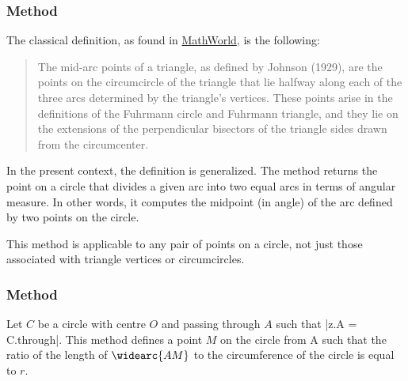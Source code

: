 \subsubsection{Method }
\label{ssub:method_circle_midarc}

The classical definition, as found in \href{https://mathworld.wolfram.com/Mid-ArcPoints.html}{MathWorld}, is the following:

\medskip
\begin{quote}
The mid-arc points of a triangle, as defined by Johnson (1929), are the points on the circumcircle of the triangle that lie halfway along each of the three arcs determined by the triangle's vertices. These points arise in the definitions of the Fuhrmann circle and Fuhrmann triangle, and they lie on the extensions of the perpendicular bisectors of the triangle sides drawn from the circumcenter.
\end{quote}

\medskip
\noindent
In the present context, the definition is generalized. The method returns the point on a circle that divides a given arc into two equal arcs in terms of angular measure. In other words, it computes the midpoint (in angle) of the arc defined by two points on the circle.

\medskip
\noindent
This method is applicable to any pair of points on a circle, not just those associated with triangle vertices or circumcircles.

\vspace{1em}
\begin{tkzexample}[latex=.5\textwidth]
\begin{center}
  \end{center}
\end{tkzexample}

\subsubsection{Method }
\label{ssub:method_circle_point}

Let $C$ be a circle with centre $O$ and passing through $A$ such that |z.A = C.through|. This method defines a point $M$ on the circle from A such that the ratio of the length of $\widearc{AM}$ to the circumference of the circle is equal to $r$.

